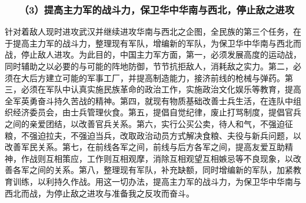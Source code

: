 \documentclass[cn,11pt,chinese]{elegantbook}
\def\myformat#1{\hfil\hfil #1}
\begin{document}
\subsubsection*{\myformat{　　（3）提高主力军的战斗力，保卫华中华南与西北，停止敌之进攻}}
针对着敌人现时进攻武汉并继续进攻华南与西北之企图，全民族的第三个任务，在于提高主力军的战斗力，整理现有军队，增编新的军队，为保卫华中华南与西北而战，停止敌人进攻。为此目的，中国主力军方面，第一，必须发展高度的运动战，同时辅助之以必要的与可能的阵地防御，节节抗拒敌人，消耗敌之实力。第二，必须在大后方建立可能的军事工厂，并提高制造能力，接济前线的枪械与弹药。第三，必须在军队中认真实施民族革命的政治工作，实施政治文化娱乐等教育，提高全军英勇奋斗持久苦战的精神。第四，就现有物质基础改善士兵生活，在连队中组织经济委员会，由士兵管理伙食。第五，提倡自觉纪律，废止打骂制度，提倡官兵之间的亲爱团结，以改善官兵关系。第六，实行公买公卖，待人和气，不强迫征粮，不强迫拉夫，不强迫当兵，改取政治动员方式解决食粮、夫役与新兵问题，以改善军民关系。第七，在前线各军之间，前线与后方各军之间，提高友爱互助精神，作战则互相策应，工作则互相观摩，消除互相观望互相嫉忌等不良现象，以改善各军之间的关系。第八，整理现有军队，补充缺额，同时增编新的军队，加紧教育训练，以利持久作战。用这一切办法，提高主力军的战斗力，为保卫华中华南与西北而战，为停止敌之进攻与准备我之反攻而奋斗。\\
\end{document}
